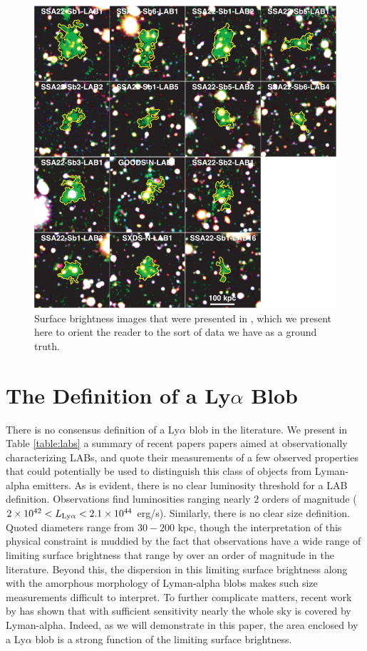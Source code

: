 \begin{figure}
    \centering
    \includegraphics[width=\textwidth,height=\textheight,keepaspectratio]{figures/matsuda2011blobs.png}
    \caption{
        Surface brightness images that were presented in \citet{Matsuda2011}, which we present here to orient the reader to the sort of data we have as a ground truth.
    }
  \label{fig:matsuda2011blobs}
\end{figure}

\section{The Definition of a Ly\texorpdfstring{$\alpha$}{a} Blob}
\label{sec:blob_definition}
There is no consensus definition of a Ly$\alpha$ blob in the literature.
We present in Table \ref{table:labs} a summary of recent papers papers aimed at observationally characterizing LABs, and quote their measurements of a few observed properties that could potentially be used to distinguish this class of objects from Lyman-alpha emitters.
As is evident, there is no clear luminosity threshold for a LAB definition.
Observations find luminosities ranging nearly $2$
orders of magnitude ($2\times10^{42}<L_{\rm Ly\alpha}<2.1\times10^{44}$ erg/s).
Similarly, there is no clear size definition.
Quoted diameters range from $30-200$ kpc, though the interpretation of this physical constraint is muddied by the fact that observations have a wide range of limiting surface brightness that range by over an order of magnitude in the literature.
Beyond this, the dispersion in this limiting surface brightness along with the amorphous morphology of Lyman-alpha blobs makes such size measurements difficult to interpret.
To further complicate matters, recent work by \citet{Wisotzki2018} has shown that with sufficient sensitivity nearly the whole sky is covered by Lyman-alpha.
Indeed, as we will demonstrate in this paper, the area enclosed by a Ly$\alpha$ blob is a strong function of the limiting surface brightness.


